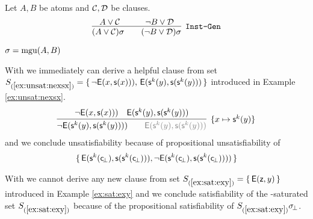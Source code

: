 \begin{definition}[\InstGen] Let $A, B$ be atoms and ${\mathcal C},{\mathcal D}$ be clauses.
	\begin{gather*}
	\infer
	[{\InstGen}] 
	{(A\lor\mathcal C)\sigma\qquad (\lnot B\lor\mathcal D)\sigma}
	{A\lor\mathcal C\quad&\quad \lnot B\lor\mathcal D}
	\end{gather*}
	\begin{center}$\sigma=\operatorname{mgu}(A,B)$
	\end{center}
\end{definition}

\begin{example}
	With \InstGen we immediately can derive a helpful clause from set
$S_{(\ref{ex:unsat:nexsx})} =
\{\,
{ \lnot{\mathsf{E}}(x, {\mathsf s}(x)))},\, 
{ {\mathsf{E}}({\mathsf s}^k(y), {\mathsf s}({\mathsf s}^k(y)))}
\,\}$ 
 introduced in Example \ref{ex:unsat:nexsx}. 
\begin{gather*}
\infer[\{x\mapsto\msucc^k(y)\}]{
	{ \lnot\mE(\msucc^k(y), \msucc(\msucc^k(y))))} \qquad
	{\colG \mE(\msucc^k(y), \msucc(\msucc^k(y)))}
}{
	{ \lnot\mE(x, \msucc(x)))} &
	{ \mE(\msucc^k(y), \msucc(\msucc^k(y)))}
}
\end{gather*}
and we conclude unsatisfiability because of propositional unsatisfiability of 
\begin{gather*}
\{\,
	{\mathsf{E}}({\mathsf s}^k({\mathsf c}\!_\bot), {\mathsf s}({\mathsf s}^k({\mathsf c}\!_\bot))), \lnot{\mathsf{E}}({\mathsf s}^k({\mathsf c}\!_\bot), {\mathsf s}({\mathsf s}^k({\mathsf c}\!_\bot)))) 
\,\}
\end{gather*}
	
\end{example}

\begin{example}
	With \InstGen we cannot derive any new clause from set 
	$S_{(\ref{ex:sat:exy})  } = \{\,{\mathsf{E}}({\mathsf z},y)\,\}$ 
	introduced in Example \ref{ex:sat:exy} and we conclude satisfiability
	of the \InstGen-saturated set $S_{(\ref{ex:sat:exy})  }$ 
	because of the propositional satisfiability of $S_{(\ref{ex:sat:exy})  }\sigma\!_\bot$.
\end{example}

